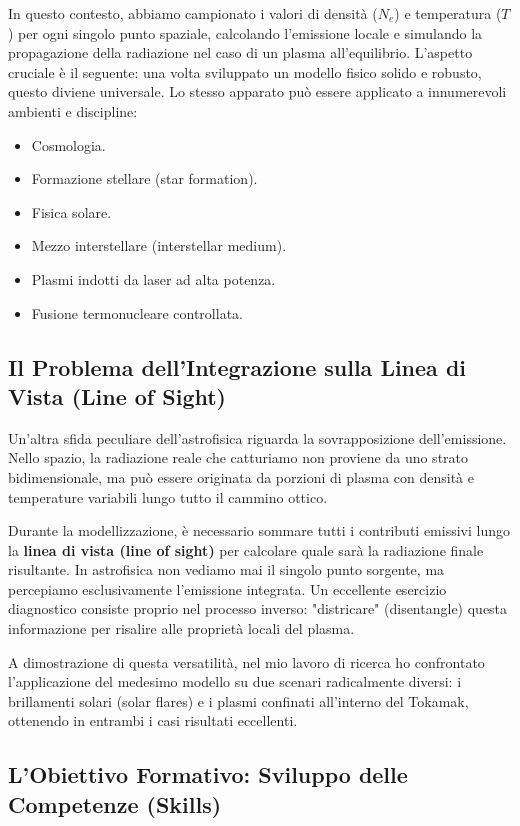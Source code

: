In questo contesto, abbiamo campionato i valori di densità ($N_e$) e temperatura ($T$) per ogni singolo punto spaziale, calcolando l'emissione locale e simulando la propagazione della radiazione nel caso di un plasma all'equilibrio.
L'aspetto cruciale è il seguente: una volta sviluppato un modello fisico solido e robusto, questo diviene universale. Lo stesso apparato può essere applicato a innumerevoli ambienti e discipline:

\begin{itemize}
    \item Cosmologia.
    \item Formazione stellare (star formation).
    \item Fisica solare.
    \item Mezzo interstellare (interstellar medium).
    \item Plasmi indotti da laser ad alta potenza.
    \item Fusione termonucleare controllata.
\end{itemize}

    \subsection{Il Problema dell'Integrazione sulla Linea di Vista (Line of Sight)}
    
    Un'altra sfida peculiare dell'astrofisica riguarda la sovrapposizione dell'emissione. Nello spazio, la radiazione reale che catturiamo non proviene da uno strato bidimensionale, ma può essere originata da porzioni di plasma con densità e temperature variabili lungo tutto il cammino ottico.
    
    Durante la modellizzazione, è necessario sommare tutti i contributi emissivi lungo la \textbf{linea di vista (line of sight)} per calcolare quale sarà la radiazione finale risultante. In astrofisica non vediamo mai il singolo punto sorgente, ma percepiamo esclusivamente l'emissione integrata. Un eccellente esercizio diagnostico consiste proprio nel processo inverso: "districare" (disentangle) questa informazione per risalire alle proprietà locali del plasma.
    
    A dimostrazione di questa versatilità, nel mio lavoro di ricerca ho confrontato l'applicazione del medesimo modello su due scenari radicalmente diversi: i brillamenti solari (solar flares) e i plasmi confinati all'interno del Tokamak, ottenendo in entrambi i casi risultati eccellenti.
    
    \subsection{L'Obiettivo Formativo: Sviluppo delle Competenze (Skills)}
    
